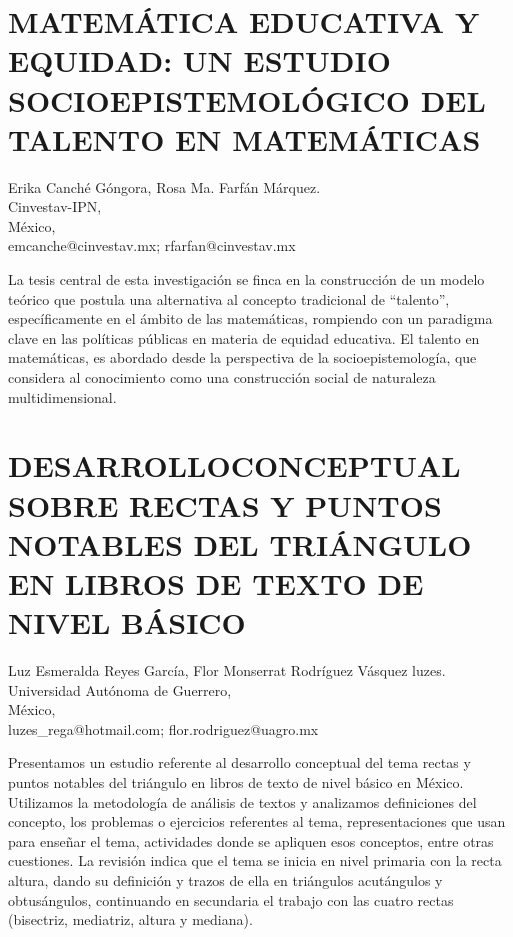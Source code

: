 \section{MATEMÁTICA EDUCATIVA Y EQUIDAD: UN ESTUDIO SOCIOEPISTEMOLÓGICO DEL
TALENTO EN MATEMÁTICAS }

\begin{datos}
Erika Canché Góngora, Rosa Ma. Farfán Márquez.\\
Cinvestav-IPN,\\
\hfill México, \\
\hfill emcanche@cinvestav.mx; rfarfan@cinvestav.mx
\end{datos}

La tesis central de esta investigación se finca en la construcción
de un modelo teórico que postula una alternativa al concepto tradicional
de “talento”, específicamente en el ámbito de las matemáticas, rompiendo
con un paradigma clave en las políticas públicas en materia de equidad
educativa. El talento en matemáticas, es abordado desde la perspectiva
de la socioepistemología, que considera al conocimiento como una construcción
social de naturaleza multidimensional. 


\section{DESARROLLOCONCEPTUAL SOBRE RECTAS Y PUNTOS NOTABLES DEL TRIÁNGULO
EN LIBROS DE TEXTO DE NIVEL BÁSICO}

\begin{datos}
Luz Esmeralda Reyes García, Flor Monserrat Rodríguez Vásquez luzes.\\
Universidad Autónoma de Guerrero,\\
\hfill México, \\
\hfill luzes\_{}rega@hotmail.com; flor.rodriguez@uagro.mx
\end{datos}

Presentamos un estudio referente al desarrollo conceptual del tema
rectas y puntos notables del triángulo en libros de texto de nivel
básico en México. Utilizamos la metodología de análisis de textos
y analizamos definiciones del concepto, los problemas o ejercicios
referentes al tema, representaciones que usan para enseñar el tema,
actividades donde se apliquen esos conceptos, entre otras cuestiones.
La revisión indica que el tema se inicia en nivel primaria con la
recta altura, dando su definición y trazos de ella en triángulos acutángulos
y obtusángulos, continuando en secundaria el trabajo con las cuatro
rectas (bisectriz, mediatriz, altura y mediana). 


